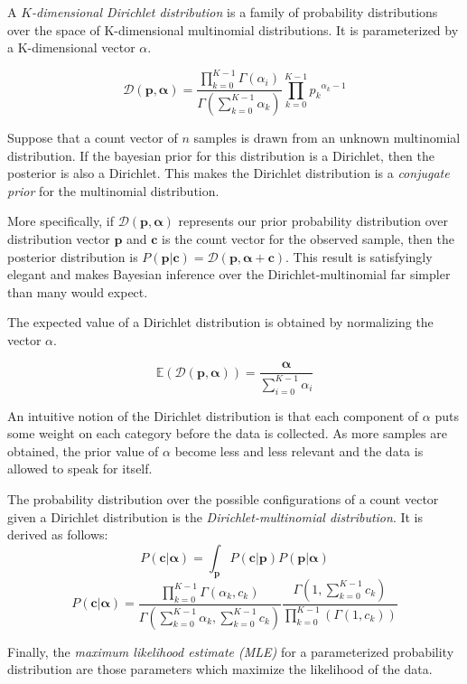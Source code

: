 \documentclass[twoside]{article}
\begin{document}
A \textit{\(K\)-dimensional Dirichlet distribution} is a family of probability distributions over the space of K-dimensional multinomial distributions.  It is parameterized by a K-dimensional vector $\alpha$.

\[\mathcal{D}(\mathbf{p},\mathbf{\alpha})=\frac{\prod_{k=0}^{K-1}\Gamma(\alpha_i)}{\Gamma\left(\sum_{k=0}^{K-1}\alpha_k\right)}\prod_{k=0}^{K-1}{p_k}^{\alpha_k-1}\]

Suppose that a count vector of \(n\) samples is drawn from an unknown multinomial distribution. If the bayesian prior for this distribution is a Dirichlet, then the posterior is also a Dirichlet. This makes the Dirichlet distribution is a \textit{conjugate prior} for the multinomial distribution.

More specifically, if \(\mathcal{D}(\mathbf{p},\mathbf{\alpha})\) represents our prior probability distribution over distribution vector \(\mathbf{p}\) and \(\mathbf{c}\) is the count vector for the observed sample, then the posterior distribution is  $P(\mathbf{p} | \mathbf{c})=\mathcal{D}(\mathbf{p},\mathbf{\alpha} + \mathbf{c})$. This result is satisfyingly elegant and makes Bayesian inference over the Dirichlet-multinomial far simpler than many would expect.

The expected value of a Dirichlet distribution is obtained by normalizing the vector $\alpha$.

\[\mathbb{E}(\mathcal{D}(\mathbf{p},\mathbf{\alpha}))=\frac{\mathbf{\alpha}}{\sum_{i=0}^{K-1}\alpha_i}\]

An intuitive notion of the Dirichlet distribution is that each component of $\alpha$ puts some weight on each category before the data is collected. As more samples are obtained, the prior value of $\alpha$ become less and less relevant and the data is allowed to speak for itself.

The probability distribution over the possible configurations of a count vector given a Dirichlet distribution is the \textit{Dirichlet-multinomial distribution}.  It is derived as follows:
\[P(\mathbf{c}|\mathbf{\alpha})=\int_{\mathbf{p}}P(\mathbf{c}|\mathbf{p})P(\mathbf{p}|\mathbf{\alpha})\]
\[P(\mathbf{c}|\mathbf{\alpha})=
\frac{\prod_{k=0}^{K-1}\Gamma(\alpha_k,c_k)}{\Gamma\left(\sum_{k=0}^{K-1}\alpha_k,\sum_{k=0}^{K-1}c_k\right)}
\frac{\Gamma\left(1,\sum_{k=0}^{K-1}c_k\right)}{\prod_{k=0}^{K-1}\left(\Gamma(1,c_k)\right)}
\]

Finally, the \textit{maximum likelihood estimate (MLE)} for a parameterized probability distribution are those parameters which maximize the likelihood of the data.
\end{document}
